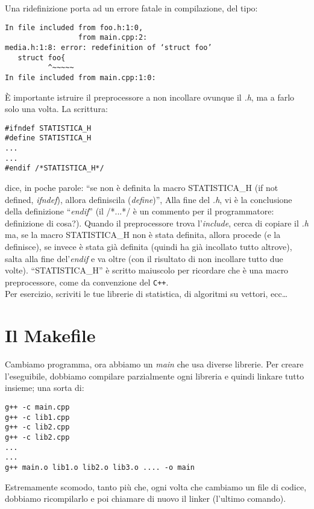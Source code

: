 Una ridefinizione porta ad un errore fatale in compilazione, del tipo:
\begin{shaded}
\begin{verbatim}
In file included from foo.h:1:0,
                 from main.cpp:2:
media.h:1:8: error: redefinition of ‘struct foo’
   struct foo{
          ^~~~~~
In file included from main.cpp:1:0:

\end{verbatim}
\end{shaded}
È importante istruire il preprocessore a non incollare ovunque il \emph{.h}, ma a farlo solo una volta. La scrittura:
\begin{lstlisting}
#ifndef STATISTICA_H
#define STATISTICA_H
...
...
#endif /*STATISTICA_H*/
\end{lstlisting}
dice, in poche parole: ``se non è definita la macro STATISTICA\_H (if not defined, \emph{ifndef}), allora definiscila (\emph{define})'', Alla fine del \emph{.h}, vi è la conclusione della definizione ``\emph{endif}'' (il /*...*/ è un commento per il programmatore: definizione di cosa?). Quando il preprocessore trova l'\emph{include}, cerca di copiare il \emph{.h} ma, se la macro STATISTICA\_H non è stata definita, allora procede (e la definisce), se invece è  stata già definita (quindi ha già incollato tutto altrove), salta alla fine del'\emph{endif} e va oltre (con il risultato di  non incollare tutto due volte). ``STATISTICA\_H'' è scritto maiuscolo per ricordare che è una macro preprocessore, come da convenzione del \verb|C++|.\\

Per esercizio, scriviti le tue librerie di statistica, di algoritmi su vettori, ecc\ldots

\section{Il Makefile}
Cambiamo programma, ora abbiamo un \emph{main} che usa diverse librerie. Per creare l'eseguibile, dobbiamo compilare parzialmente ogni libreria e quindi linkare tutto insieme; una sorta di:
\begin{shaded}
\begin{verbatim}
g++ -c main.cpp
g++ -c lib1.cpp
g++ -c lib2.cpp
g++ -c lib2.cpp
...
...
g++ main.o lib1.o lib2.o lib3.o .... -o main
\end{verbatim}
\end{shaded}
Estremamente scomodo, tanto più che, ogni volta che cambiamo un file di codice, dobbiamo ricompilarlo e poi chiamare di nuovo il linker (l'ultimo comando).

